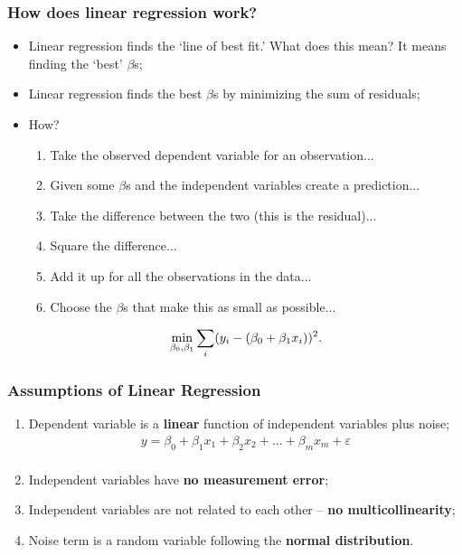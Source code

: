 \documentclass[aspectratio=169]{beamer}
\theoremstyle{principle}
\begin{document}
\begin{frame}
\frametitle{How does linear regression work?}

\begin{itemize}
\item Linear regression finds the `line of best fit.'  What does this mean?  It means finding the `best' $\beta$s;
\bigskip

\item Linear regression finds the best $\beta$s by minimizing the sum of residuals;
\bigskip

\item How?
\begin{enumerate}
\item Take the observed dependent variable for an observation...
\item Given some $\beta$s and the independent variables create a prediction...
\item Take the difference between the two (this is the residual)...
\item Square the difference...
\item Add it up for all the observations in the data...
\item Choose the $\beta$s that make this as small as possible...
\end{enumerate}
\begin{align*}
\min_{\beta_0,\beta_1}\color{black}\sum_i(y_i - (\beta_0 + \beta_1 x_i))^2.
\end{align*}
\end{itemize}

\end{frame}

\begin{frame}
\frametitle{Assumptions of Linear Regression}

\begin{enumerate}
\item Dependent variable is a \textbf{linear} function of independent variables plus noise;
\begin{align*}
y = \beta_0 + \beta_1x_1 + \beta_2x_2 + \hdots + \beta_mx_m + \varepsilon\\
\end{align*}

\item Independent variables have \textbf{no measurement error};
\bigskip
\bigskip

\item Independent variables are not related to each other -- \textbf{no multicollinearity};
\bigskip
\bigskip

\item Noise term is a random variable following the \textbf{normal distribution}.

\end{enumerate}

\end{frame}
\end{document}
